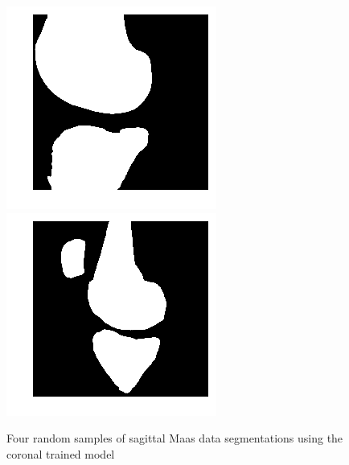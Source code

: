 \begin{figure}[H]
  \includegraphics[width=\linewidth]{imgs/transfer_pers_y3.png}
\endminipage\hfill
{}%
  \includegraphics[width=\linewidth]{imgs/transfer_pers_y4.png}
\endminipage
\caption{Four random samples of sagittal Maas data segmentations using the coronal trained model}
\end{figure}

